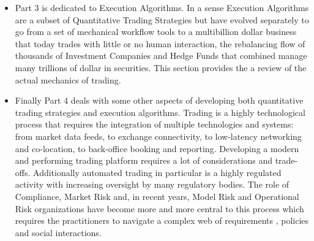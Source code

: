 \begin{itemize}
\item Part 3 is dedicated to Execution Algorithms. In a sense Execution Algorithms are a subset of Quantitative Trading Strategies but have evolved separately to go from a set of mechanical workflow tools to a multibillion dollar business that today trades with little or no human interaction, the rebalancing flow of thousands of Investment Companies and Hedge Funds that combined manage many trillions of dollar in securities. This section provides the a review of the actual mechanics of trading. 

\item Finally Part 4 deals with some other aspects of developing both quantitative trading strategies and execution algorithms. Trading is a highly technological process that requires the integration of multiple technologies and systems: from market data feeds, to exchange connectivity, to low-latency networking and co-location, to back-office booking and reporting. Developing a modern and performing trading platform requires a lot of considerations and trade-offs. Additionally automated trading in particular is a highly regulated activity with increasing oversight by many regulatory bodies. The role of Compliance, Market Risk and, in recent years, Model Risk and Operational Risk organizations have become more and more central to this process which requires the practitioners to navigate a  complex web of requirements , policies and social interactions.
\end{itemize}


